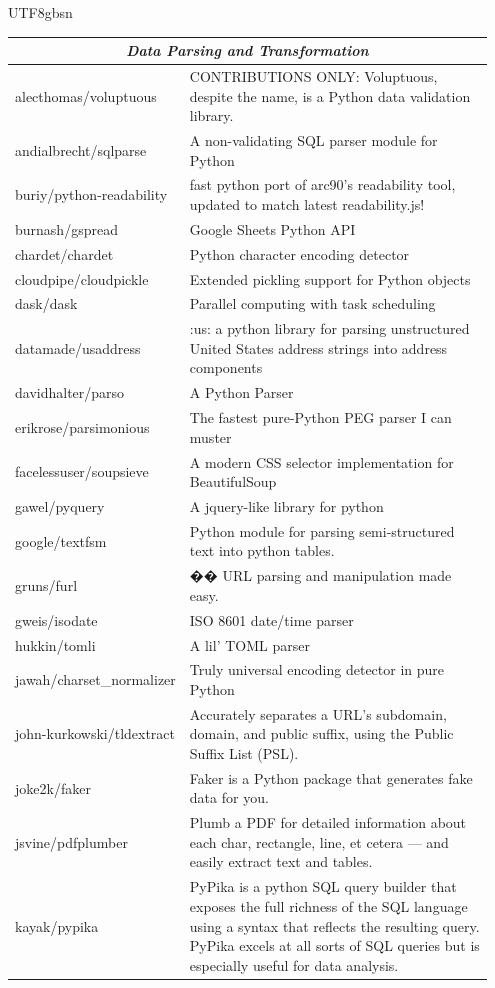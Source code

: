 \begin{CJK*}{UTF8}{gbsn}
\begin{longtable}{p{0.3\linewidth} | p{0.65\linewidth}}
\midrule
\multicolumn{2}{c}{\textit{Data Parsing and Transformation}} \\
\midrule
alecthomas/voluptuous & CONTRIBUTIONS ONLY: Voluptuous, despite the name, is a Python data validation library. \\
andialbrecht/sqlparse & A non-validating SQL parser module for Python \\
buriy/python-readability & fast python port of arc90's readability tool, updated to match latest readability.js! \\
burnash/gspread & Google Sheets Python API \\
chardet/chardet & Python character encoding detector \\
cloudpipe/cloudpickle & Extended pickling support for Python objects \\
dask/dask & Parallel computing with task scheduling \\
datamade/usaddress & :us: a python library for parsing unstructured United States address strings into address components \\
davidhalter/parso & A Python Parser \\
erikrose/parsimonious & The fastest pure-Python PEG parser I can muster \\
facelessuser/soupsieve & A modern CSS selector implementation for BeautifulSoup \\
gawel/pyquery & A jquery-like library for python \\
google/textfsm & Python module for parsing semi-structured text into python tables. \\
gruns/furl & �� URL parsing and manipulation made easy. \\
gweis/isodate & ISO 8601 date/time parser \\
hukkin/tomli & A lil' TOML parser \\
jawah/charset\_normalizer & Truly universal encoding detector in pure Python \\
john-kurkowski/tldextract & Accurately separates a URL’s subdomain, domain, and public suffix, using the Public Suffix List (PSL). \\
joke2k/faker & Faker is a Python package that generates fake data for you. \\
jsvine/pdfplumber & Plumb a PDF for detailed information about each char, rectangle, line, et cetera — and easily extract text and tables. \\
kayak/pypika & PyPika is a python SQL query builder that exposes the full richness of the SQL language using a syntax that reflects the resulting query. PyPika excels at all sorts of SQL queries but is especially useful for data analysis. \\

\end{longtable}
\end{CJK*}
